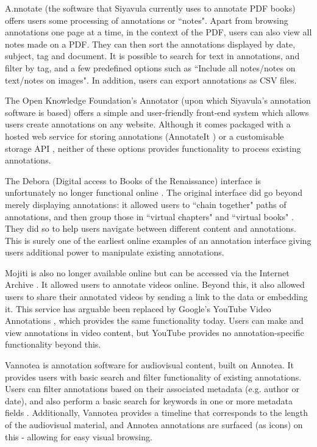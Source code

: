 A.nnotate \citep{AnnotateCom} (the software that Siyavula currently uses to annotate PDF books) offers users some processing of annotations or ``notes". Apart from browsing annotations one page at a time, in the context of the PDF, users can also view all notes made on a PDF. They can then sort the annotations displayed by date, subject, tag and document. It is possible to search for text in annotations, and filter by tag, and a few predefined options such as ``Include all notes/notes on text/notes on images". In addition, users can export annotations as CSV files.

The Open Knowledge Foundation's Annotator (upon which Siyavula's annotation software is based) \citep{Annotator} offers a simple and user-friendly front-end system which allows users create annotations on any website. Although it comes packaged with a hosted web service for storing annotations (AnnotateIt \citep{AnnotateIt}) or a customisable storage API \citep{AnnotatorAPI}, neither of these options provides functionality to process existing annotations.

The Debora (Digital access to Books of the Renaissance) interface \citep{debora} is unfortunately no longer functional online \citep{DeboraLink}. The original interface did go beyond merely displaying annotations: it allowed users to ``chain together" paths of annotations, and then group those in ``virtual chapters" and ``virtual books" \citep{debora}. They did so to help users navigate between different content and annotations. This is surely one of the earliest online examples of an annotation interface giving users additional power to manipulate existing annotations. 

Mojiti \citep{Mojiti} is also no longer available online but can be accessed via the Internet Archive \citep{InternetArchive}. It allowed users to annotate videos online. Beyond this, it also allowed users to share their annotated videos by sending a link to the data or embedding it. This service has arguable been replaced by Google's YouTube Video Annotations \citep{YouTubeAnns}, which provides the same functionality today. Users can make and view annotations in video content, but YouTube provides no annotation-specific functionality beyond this. 

Vannotea \citep{Vannotea} is annotation software for audiovisual content, built on Annotea. It provides users with basic search and filter functionality of existing annotations. Users can filter annotations based on their associated metadata (e.g. author or date), and also perform a basic search for keywords in one or more metadata fields \citep{AnnoteaSidebarDoc}. Additionally, Vannotea provides a timeline that corresponds to the length of the audiovisual material, and Annotea annotations are surfaced (as icons) on this - allowing for easy visual browsing. 

